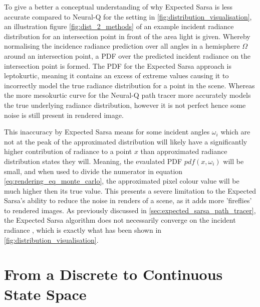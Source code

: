 \documentclass[../dissertation.tex]{subfiles}
\begin{document}
To give a better a conceptual understanding of why Expected Sarsa is less accurate compared to Neural-Q for the setting in \ref{fig:distribution_visualisation}, an illustration figure \ref{fig:dist_2_methods} of an example incident radiance distribution for an intersection point in front of the area light is given. Whereby normalising the incidence radiance prediction over all angles in a hemisphere $\Omega$ around an intersection point, a PDF over the predicted incident radiance on the intersection point is formed. The PDF for the Expected Sarsa approach is leptokurtic, meaning it contains an excess of extreme values causing it to incorrectly model the true radiance distribution for a point in the scene. Whereas the more mesokurtic curve for the Neural-Q path tracer more accurately models the true underlying radiance distribution, however it is not perfect hence some noise is still present in rendered image.

 This inaccuracy by Expected Sarsa means for some incident angles $\omega_i$ which are not at the peak of the approximated distribution will likely have a significantly higher contribution of radiance to a point $x$ than approximated radiance distribution states they will. Meaning, the evaulated PDF $pdf(x, \omega_i)$ will be small, and when used to divide the numerator in equation \ref{eq:rendering_eq_monte_carlo}, the approximated pixel colour value will be much higher then its true value. This presents a severe limitation to the Expected Sarsa's ability to reduce the noise in renders of a scene, as it adds more 'fireflies' to rendered images. As previously discussed in \ref{sec:expected_sarsa_path_tracer}, the Expected Sarsa algorithm does not necessarily converge on the incident radiance \cite{dahm2017learning}, which is exactly what has been shown in \ref{fig:distribution_visualisation}.

\section{From a Discrete to Continuous State Space}
\end{document}
